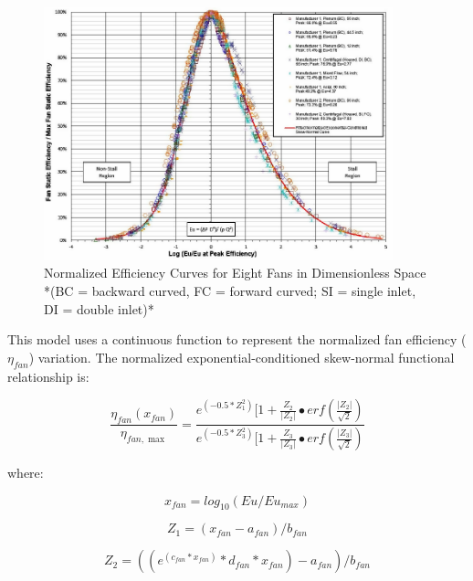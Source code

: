 \begin{figure}[hbtp] %
\centering
\includegraphics[width=0.9\textwidth, height=0.9\textheight, keepaspectratio=true]{media/image4895.png}
\caption{Normalized Efficiency Curves for Eight Fans in Dimensionless Space *(BC = backward curved, FC = forward curved; SI = single inlet, DI = double inlet)* \protect \label{fig:normalized-efficiency-curves-for-eight-fans}}
\end{figure}

This model uses a continuous function to represent the normalized fan efficiency (\(\eta_{fan}\)) variation. The normalized exponential-conditioned skew-normal functional relationship is:

\begin{equation}
\frac{{{\eta_{fan}}({x_{fan}})}}{{{\eta_{fan,\max }}}} = \frac{{{e^{( - 0.5*Z_1^2)}}[1 + \frac{{{Z_2}}}{{\left| {{Z_2}} \right|}} \bullet erf\left( {\frac{{\left| {{Z_2}} \right|}}{{\sqrt 2 }}} \right)}}{{{e^{( - 0.5*Z_3^2)}}[1 + \frac{{{Z_3}}}{{\left| {{Z_3}} \right|}} \bullet erf\left( {\frac{{\left| {{Z_3}} \right|}}{{\sqrt 2 }}} \right)}}
\label{eq:etafanoveretafanmax}
\end{equation}

where:

\begin{equation}
x_{fan} = log_{10}(Eu / Eu_{max})
\end{equation}

\begin{equation}
Z_{1} = (x_{fan} - a_{fan}) / b_{fan}
\end{equation}

\begin{equation}
Z_{2} = ((e^{(c_{fan}*{x_{fan}})}*d_{fan}*x_{fan}) - a_{fan}) / b_{fan}
\end{equation}

